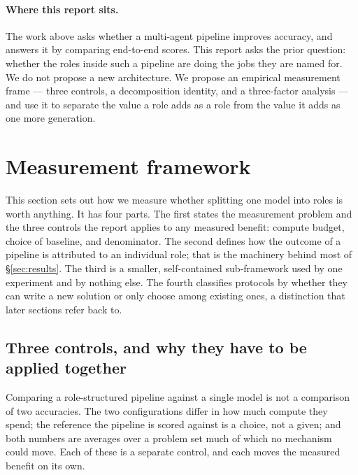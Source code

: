 \documentclass[11pt,a4paper]{article}
\begin{document}
\paragraph{Where this report sits.} The work above asks whether a multi-agent pipeline improves accuracy, and answers it by comparing end-to-end scores. This report asks the prior question: whether the roles inside such a pipeline are doing the jobs they are named for. We do not propose a new architecture. We propose an empirical measurement frame --- three controls, a decomposition identity, and a three-factor analysis --- and use it to separate the value a role adds as a role from the value it adds as one more generation.


\section{Measurement framework}\label{sec:framework}

This section sets out how we measure whether splitting one model into roles is worth anything. It
has four parts. The first states the measurement problem and the three controls the report applies
to any measured benefit: compute budget, choice of baseline, and denominator. The second defines
how the outcome of a pipeline is attributed to an individual role; that is the machinery behind
most of \S\ref{sec:results}. The third is a smaller, self-contained sub-framework used by one
experiment and by nothing else. The fourth classifies protocols by whether they can write a new
solution or only choose among existing ones, a distinction that later sections refer back to.

\subsection{Three controls, and why they have to be applied together}\label{sec:controls}

Comparing a role-structured pipeline against a single model is not a comparison of two accuracies.
The two configurations differ in how much compute they spend; the reference the pipeline is scored
against is a choice, not a given; and both numbers are averages over a problem set much of which no
mechanism could move. Each of these is a separate control, and each moves the measured benefit on
its own.
\end{document}
